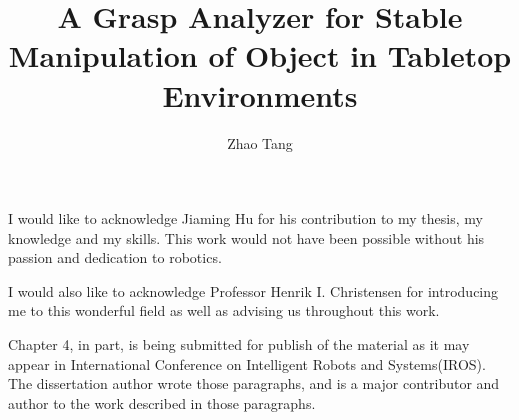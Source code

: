 \documentclass[12pt]{ucsddissertation}
\title{A Grasp Analyzer for Stable Manipulation of Object in Tabletop Environments}
\author{Zhao Tang}
\begin{document}
\frontmatter
\maketitle
\makecopyright
\makesignature


\tableofcontents
\listoffigures
\listoftables


\begin{acknowledgements}
I would like to acknowledge Jiaming Hu for his contribution to my thesis, my knowledge and my skills. This work would not have been possible without his passion and dedication to robotics.

I would also like to acknowledge Professor Henrik I. Christensen for introducing me to this wonderful field as well as advising us throughout this work. 

Chapter 4, in part, is being submitted for publish  of the material as it may appear in International Conference on Intelligent Robots and Systems(IROS). The dissertation author wrote those paragraphs, and is a major contributor and author to the work described in those paragraphs.
\end{acknowledgements}

%
%
%
\end{document}
